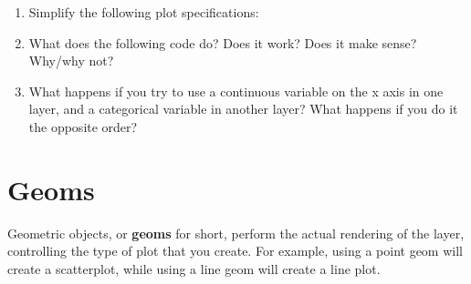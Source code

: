 \begin{enumerate}
\def\labelenumi{\arabic{enumi}.}
\item
  Simplify the following plot specifications:

\begin{Shaded}
\begin{Highlighting}[]
\StringTok{ }
\StringTok{  }\NormalTok{(}

\NormalTok{() +}\StringTok{ }
\StringTok{ }\NormalTok{(} \NormalTok{(}   
\StringTok{ }\NormalTok{(}  

\StringTok{ }
\StringTok{  }\NormalTok{(}\NormalTok{(} 
\end{Highlighting}
\end{Shaded}
\item
  What does the following code do? Does it work? Does it make sense?
  Why/why not?

\begin{Shaded}
\begin{Highlighting}[]
\StringTok{  }\NormalTok{(}\StringTok{ }
\StringTok{  }\NormalTok{(}
\end{Highlighting}
\end{Shaded}
\item
  What happens if you try to use a continuous variable on the x axis in
  one layer, and a categorical variable in another layer? What happens
  if you do it the opposite order?
\end{enumerate}

\section{Geoms}\label{sec:geom}

Geometric objects, or \textbf{geoms} for short, perform the actual
rendering of the layer, controlling the type of plot that you create.
For example, using a point geom will create a scatterplot, while using a
line geom will create a line plot.

